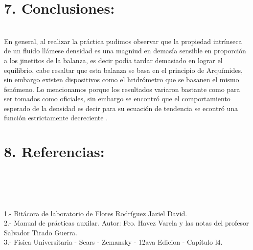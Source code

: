 \documentclass[10pt,a4paper]{article}
\begin{document}
\section*{7. Conclusiones:}\\
En general, al realizar la pr\'{a}ctica pudimos observar que la propiedad intr\'{i}nseca de un fluido ll\'{a}mese densidad es una magniud en demas\'{i}a sensible en proporci\'{o}n a los jinetitos de la balanza, es decir pod\'{i}a tardar demasiado en lograr el equilibrio, cabe resaltar que esta balanza se basa en el principio de Arqu\'{i}mides, sin embargo existen dispositivos como el hridr\'{o}metro que se basanen el mismo fen\'{o}meno. Lo mencionamos porque los resultados variaron bastante como para ser tomados como oficiales, sin embargo se encontr\'{o} que el comportamiento esperado de la densidad es decir para su ecuaci\'{o}n de tendencia se econtr\'{o} una funci\'{o}n estrictamente decreciente .
\section*{8. Referencias:}\\
\\
\medskip
\\
\\1.- Bit\'{a}cora de laboratorio de Flores Rodr\'{i}guez Jaziel David.
\\
2.- Manual de pr\'{a}cticas auxilar. Autor: Fco. Havez Varela y las notas del profesor Salvador Tirado Guerra.
\\
3.- Fisica Universitaria - Sears - Zemansky - 12ava Edicion - Cap\'{i}tulo l4.
\end{document}
